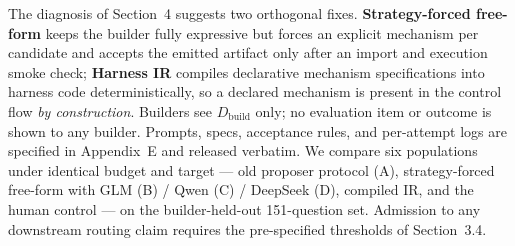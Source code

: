 The diagnosis of Section~4 suggests two orthogonal fixes.
\textbf{Strategy-forced free-form} keeps the builder fully expressive
but forces an explicit mechanism per candidate and accepts the emitted
artifact only after an import and execution smoke check;
\textbf{Harness IR} compiles declarative mechanism specifications into
harness code deterministically, so a declared mechanism is present in
the control flow \emph{by construction}. Builders see
\(D_{\mathrm{build}}\) only; no evaluation item or outcome is shown to
any builder. Prompts, specs, acceptance rules, and per-attempt logs are
specified in Appendix~E and released verbatim. We compare six
populations under identical budget and target --- old proposer protocol
(A), strategy-forced free-form with GLM (B) / Qwen (C) / DeepSeek (D),
compiled IR, and the human control --- on the builder-held-out
151-question set. Admission to any downstream routing claim requires the
pre-specified thresholds of Section~3.4.
